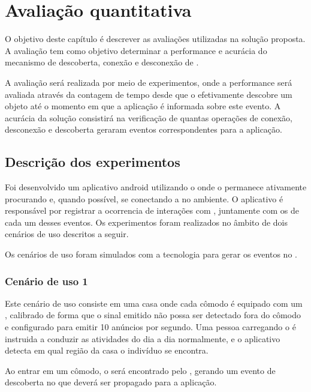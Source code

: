 \chapter{Avaliação quantitativa}\label{chap:avaliacao}

O objetivo deste capítulo é descrever as avaliações utilizadas na solução proposta. A avaliação tem como objetivo determinar a performance e acurácia do mecanismo de descoberta, conexão e desconexão de \smartobjs{}.

A avaliação será realizada por meio de experimentos, onde a performance será avaliada através da contagem de tempo desde que o \mhub{} efetivamente descobre um objeto até o momento em que a aplicação é informada sobre este evento. A acurácia da solução consistirá na verificação de quantas operações de conexão, desconexão e descoberta geraram eventos correspondentes para a aplicação.

\section{Descrição dos experimentos}

Foi desenvolvido um aplicativo android utilizando o \mhubcddl{} onde o \smartphone{} permanece ativamente procurando e, quando possível, se conectando a \smartobjs{} no ambiente. O aplicativo é responsável por registrar a ocorrencia de interações com \smartobjs{}, juntamente com os \timestamps{} de cada um desses eventos. Os experimentos foram realizados no âmbito de dois cenários de uso descritos a seguir.

Os cenários de uso foram simulados com a tecnologia \fakesensor{} para gerar os eventos no \stwopa{}.

\subsection{Cenário de uso 1}

Este cenário de uso consiste em uma casa onde cada cômodo é equipado com um \beacon{} \ble{}, calibrado de forma que o sinal emitido não possa ser detectado fora do cômodo e configurado para emitir 10 anúncios por segundo. Uma pessoa carregando o \smartphone{} é instruida a conduzir as atividades do dia a dia normalmente, e o aplicativo detecta em qual região da casa o indivíduo se encontra.

Ao entrar em um cômodo, o \beacon{} será encontrado pelo \mhubcddl{}, gerando um evento de descoberta no \stwopa{} que deverá ser propagado para a aplicação.

